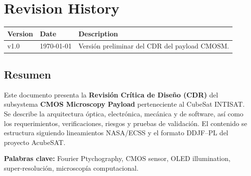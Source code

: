 \documentclass[12pt]{report}
\newcommand{\docdate}{\today}
\begin{document}
\chapter*{Revision History}
\begin{longtable}{p{2cm} p{3cm} p{8cm}}
\toprule
\textbf{Version} & \textbf{Date} & \textbf{Description} \\
\midrule
v1.0 & \docdate & Versión preliminar del CDR del payload CMOSM. \\
\bottomrule
\end{longtable}

\clearpage

\section*{Resumen}
Este documento presenta la \textbf{Revisión Crítica de Diseño (CDR)} del 
subsystema \textbf{CMOS Microscopy Payload} perteneciente al CubeSat INTISAT.
Se describe la arquitectura óptica, electrónica, mecánica y de software, así 
como los requerimientos, verificaciones, riesgos y pruebas de validación.
El contenido se estructura siguiendo lineamientos NASA/ECSS y el formato 
DDJF–PL del proyecto AcubeSAT.

\vspace{0.3cm}
\noindent\textbf{Palabras clave:} Fourier Ptychography, CMOS sensor, OLED illumination,
super-resolución, microscopía computacional.

\clearpage
\tableofcontents
\clearpage





\appendix






\end{document}
